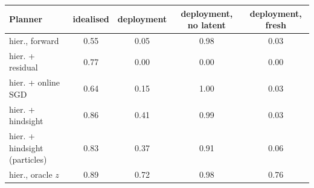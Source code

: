 \begin{tabular}{lcccc}
\toprule
Planner & idealised & deployment & deployment, no latent & deployment, fresh \\
\midrule
hier., forward & 0.55 & 0.05 & 0.98 & 0.03 \\
hier. + residual & 0.77 & 0.00 & 0.00 & 0.00 \\
hier. + online SGD & 0.64 & 0.15 & 1.00 & 0.03 \\
hier. + hindsight & 0.86 & 0.41 & 0.99 & 0.03 \\
hier. + hindsight (particles) & 0.83 & 0.37 & 0.91 & 0.06 \\
hier., oracle $z$ & 0.89 & 0.72 & 0.98 & 0.76 \\
\bottomrule
\end{tabular}
